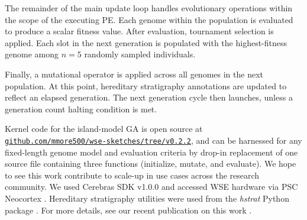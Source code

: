 The remainder of the main update loop handles evolutionary operations within the scope of the executing PE.
Each genome within the population is evaluated to produce a scalar fitness value.
After evaluation, tournament selection is applied.
Each slot in the next generation is populated with the highest-fitness genome among $n=5$ randomly sampled individuals.

Finally, a mutational operator is applied across all genomes in the next population.
At this point, hereditary stratigraphy annotations are updated to reflect an elapsed generation.
The next generation cycle then launches, unless a generation count halting condition is met.




Kernel code for the island-model GA is open source at\\ \href{https://github.com/mmore500/wse-sketches/tree/v0.2.2}{\texttt{github.com/mmore500/wse-sketches/tree/v0.2.2}}, and can be harnessed for any fixed-length genome model and evaluation criteria by drop-in replacement of one source file containing three functions (initialize, mutate, and evaluate).
We hope to see this work contribute to scale-up in use cases across the research community.
We used Cerebras SDK v1.0.0 \cite{selig2022cerebras} and accessed WSE hardware via PSC Neocortex \cite{buitrago2021neocortex}.
Hereditary stratigraphy utilities were used from the \textit{hstrat} Python package \cite{moreno2022hstrat}.
For more details, see our recent publication on this work \cite{moreno2024trackable}.
